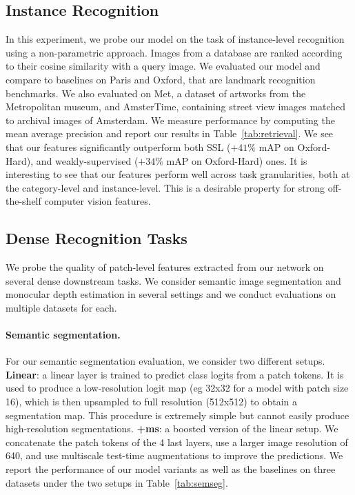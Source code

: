 \subsection{Instance Recognition} In this experiment, we probe our model on the task of instance-level recognition using a non-parametric approach. Images from a database are ranked according to their cosine similarity with a query image. We evaluated our model and compare to baselines on Paris and Oxford, that are landmark recognition benchmarks. We also evaluated on Met, a dataset of artworks from the Metropolitan museum, and AmsterTime, containing street view images matched to archival images of Amsterdam. We measure performance by computing the mean average precision and report our results in Table~\ref{tab:retrieval}.
We see that our features significantly outperform both SSL ($+41\%$ mAP on Oxford-Hard), and weakly-supervised ($+34\%$ mAP on Oxford-Hard) ones. It is interesting to see that our features perform well across task granularities, both at the category-level and instance-level. This is a desirable property for strong off-the-shelf computer vision features.

\subsection{Dense Recognition Tasks} We probe the quality of patch-level features extracted from our network on several dense downstream tasks. We consider semantic image segmentation and monocular depth estimation in several settings and we conduct evaluations on multiple datasets for each.

\paragraph{Semantic segmentation.} For our semantic segmentation evaluation, we consider two different setups.
\textbf{Linear}: a linear layer is trained to predict class logits from a patch tokens. It is used to produce a low-resolution logit map (eg 32x32 for a model with patch size 16), which is then upsampled to full resolution (512x512) to obtain a segmentation map. This procedure is extremely simple but cannot easily produce high-resolution segmentations.
\textbf{+ms}: a boosted version of the linear setup. We concatenate the patch tokens of the 4 last layers, use a larger image  resolution of 640, and use multiscale test-time augmentations to improve the predictions. We report the performance of our model variants as well as the baselines on three datasets under the two setups in Table~\ref{tab:semseg}.

